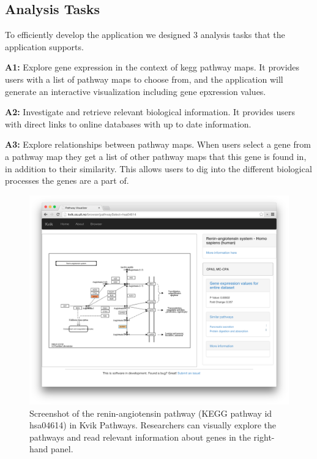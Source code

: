 \subsection{Analysis Tasks} 
To efficiently develop the application we designed 3 analysis tasks that the
application supports. 

\textbf{A1:} Explore gene expression in the context of \gls{kegg} pathway maps.
It provides users with a list of pathway maps to choose from, and the
application will generate an interactive visualization including gene epxression
values. 

\textbf{A2:} Investigate and retrieve relevant biological information. It
provides users with direct links to online databases with up to date
information. 

\textbf{A3:} Explore relationships between pathway maps. When users select a
gene from a pathway map they get a list of other pathway maps that this
gene is found in, in addition to their similarity. This allows users to dig into
the different biological processes the genes are a part of. 

\begin{figure}[htb!]
    \begin{centering}
    \includegraphics[width=\textwidth]{figures/kvikpwfig.png}
        \caption{Screenshot of the renin-angiotensin pathway (KEGG pathway id
        hsa04614) in Kvik Pathways. Researchers can visually explore the
        pathways and read relevant information about genes in the right-hand
        panel.}
    \label{kvikpwfig}
    \end{centering} 
\end{figure}


